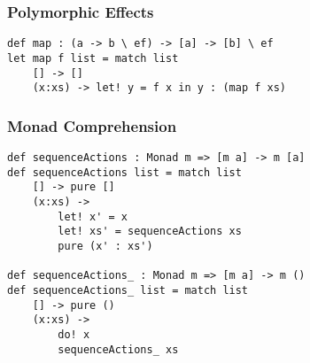 \documentclass{article}
\begin{document}
\subsubsection{Polymorphic Effects}
\begin{verbatim}
def map : (a -> b \ ef) -> [a] -> [b] \ ef
let map f list = match list
    [] -> []
    (x:xs) -> let! y = f x in y : (map f xs)
\end{verbatim}

\subsubsection{Monad Comprehension}
\begin{verbatim}
def sequenceActions : Monad m => [m a] -> m [a]
def sequenceActions list = match list
    [] -> pure []
    (x:xs) ->
        let! x' = x
        let! xs' = sequenceActions xs
        pure (x' : xs')

def sequenceActions_ : Monad m => [m a] -> m ()
def sequenceActions_ list = match list
    [] -> pure ()
    (x:xs) ->
        do! x
        sequenceActions_ xs
\end{verbatim}
\end{document}
